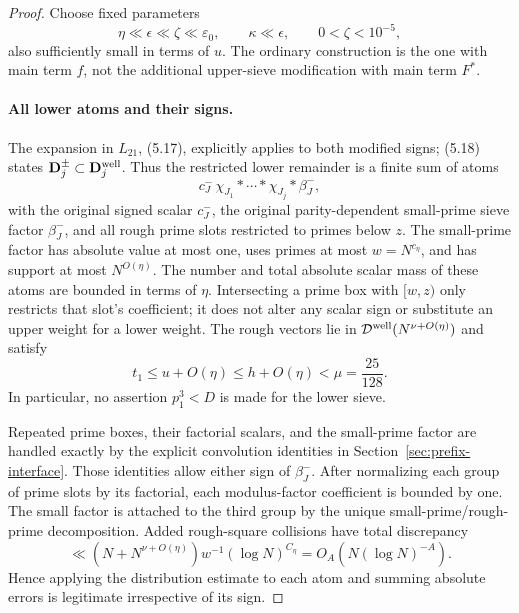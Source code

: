 \documentclass[11pt]{article}
\begin{document}
\begin{proof}
Choose fixed parameters
\[
 \eta\ll\epsilon\ll\zeta\ll\varepsilon_0,
 \qquad \kappa\ll\epsilon,
 \qquad 0<\zeta<10^{-5},
\]
also sufficiently small in terms of $u$. The ordinary construction
is the one with main term $f$, not the additional upper-sieve
modification with main term $F^*$.

\paragraph{All lower atoms and their signs.}
The expansion in $L_{21}$, (5.17), explicitly applies to both
modified signs; (5.18) states
$\mathbf D_j^\pm\subset\mathbf D_j^{\rm well}$.
Thus the restricted lower remainder is a finite sum of atoms
\[
 c_J^-\,\chi_{J_1}*\cdots*\chi_{J_j}*\beta_J^-,
\]
with the original signed scalar $c_J^-$, the original parity-dependent
small-prime sieve factor $\beta_J^-$, and all rough prime slots
restricted to primes below $z$. The small-prime factor has absolute
value at most one, uses primes at most $w=N^{c_\eta}$, and has support
at most $N^{O(\eta)}$. The number and total absolute scalar mass
of these atoms are bounded in terms of $\eta$.
Intersecting a prime box with $[w,z)$ only restricts that slot's
coefficient; it does not alter any scalar sign or substitute an
upper weight for a lower weight. The rough vectors lie in
$\mathcal D^{\rm well}(N^{\nu+O(\eta)})$ and satisfy
\[
 t_1\le u+O(\eta)\le h+O(\eta)<\mu=\frac{25}{128}.
\]
In particular, no assertion $p_1^3<D$ is made for the lower sieve.

Repeated prime boxes, their factorial scalars, and the small-prime
factor are handled exactly by the explicit convolution identities
in Section~\ref{sec:prefix-interface}. Those identities allow either
sign of $\beta_J^-$. After normalizing each group of prime slots by
its factorial, each modulus-factor coefficient is bounded by one.
The small factor is attached to the third group by the unique
small-prime/rough-prime decomposition. Added rough-square collisions
have total discrepancy
\[
 \ll (N+N^{\nu+O(\eta)})w^{-1}(\log N)^{C_\eta}
 =O_A(N(\log N)^{-A}).
\]
Hence applying the distribution estimate to each atom and summing
absolute errors is legitimate irrespective of its sign.


\end{proof}
\end{document}
